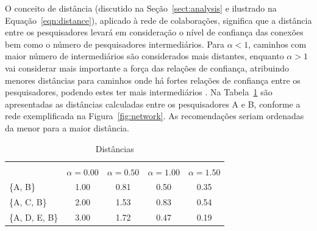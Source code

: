 \documentclass[12pt]{article}
\begin{document}
O conceito de distância (discutido na Seção~\ref{sect:analysis} e ilustrado na Equação~\ref{eqn:distance}), aplicado à rede de colaborações, significa que a distância entre os pesquisadores levará em consideração o nível de confiança das conexões bem como o número de pesquisadores intermediários. Para $\alpha < 1$, caminhos com maior número de intermediários são considerados mais distantes, enquanto $\alpha > 1$ vai considerar mais importante a força das relações de confiança, atribuindo menores distâncias para caminhos onde há fortes relações de confiança entre os pesquisadores, podendo estes ter mais intermediários \cite{opsahl2010node}. Na Tabela~\ref{tab:distances} são apresentadas as distâncias calculadas entre os pesquisadores A e B, conforme a rede exemplificada na Figura~\ref{fig:network}. As recomendações seriam ordenadas da menor para a maior distância.


  \begin{table}[ht]
    \caption{Distâncias}
    \label{tab:distances}
    \centering
    \begin{tabular}{|lcccc|}
      \hline
      \rowcolor[HTML]{343434} 
      \multicolumn{1}{|c}{\cellcolor[HTML]{343434}{\color[HTML]{FFFFFF} }}                       & \multicolumn{4}{c|}{\cellcolor[HTML]{343434}{\color[HTML]{FFFFFF} $ d^{w\alpha}(i, j) $}}                                               \\
      \rowcolor[HTML]{656565} 
      \multicolumn{1}{|c}{\multirow{-2}{*}{\cellcolor[HTML]{343434}{\color[HTML]{FFFFFF} Caminho}}} & {\color[HTML]{EFEFEF} $ \alpha = 0.00 $} & {\color[HTML]{EFEFEF} $ \alpha=0.50 $} & {\color[HTML]{EFEFEF} $ \alpha=1.00 $} & {\color[HTML]{EFEFEF} $ \alpha=1.50 $} \\ \cline{1-1}
      \multicolumn{1}{|l|}{\{A, B\}}                                                             & 1.00                        & 0.81                        & 0.50                        & 0.35                        \\
      \multicolumn{1}{|l|}{\{A, C, B\}}                                                          & 2.00                        & 1.53                        & 0.83                        & 0.54                        \\
      \multicolumn{1}{|l|}{\{A, D, E, B\}}                                                       & 3.00                        & 1.72                        & 0.47                        & 0.19                        \\ \hline
    \end{tabular}
  \end{table}  
\end{document}
